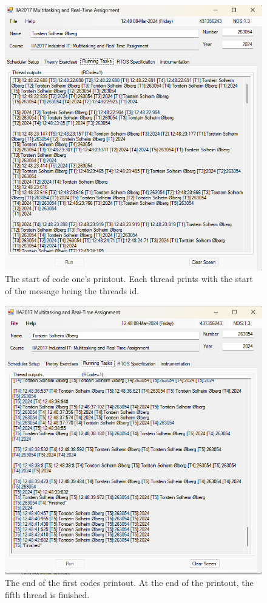 \documentclass[12pt, A4paper, english]{book}
\begin{document}
				\begin{figure}
\includegraphics[width=\linewidth]{Runtime_start1}
\caption{The start of code one's printout. Each thread prints with the start of the message being the threads id.}
\label{im:runtimestart1}
				\end{figure}
				\begin{figure}
\includegraphics[width=\linewidth]{Runtime_stop1}
\caption{The end of the first codes printout. At the end of the printout, the fifth thread is finished.}
\label{im:runtimestop1}
				\end{figure}
\end{document}
